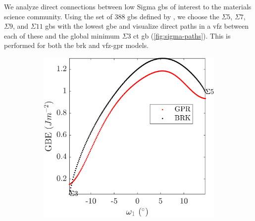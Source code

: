 \documentclass[final,twocolumn,12pt]{elsarticle}
\begin{document}
	We analyze direct connections between low Sigma \glspl{gb} of interest to the materials science community. Using the set of 388 \glspl{gb} defined by \citet{olmstedSurveyComputedGrain2009}, we choose the $\Sigma5$, $\Sigma7$, $\Sigma9$, and $\Sigma11$ \glspl{gb} with the lowest \gls{gbe} and visualize direct paths in a \gls{vfz} between each of these and the global minimum $\Sigma3$ \gls{ct} \gls{gb} (\cref{fig:sigma-paths}). This is performed for both the \gls{brk} and \gls{vfz}-\gls{gpr} models.
	
	\begin{figure}[!htb]
		\centering
		\begin{subfigure}[b]{0.48\textwidth}
			\includegraphics[width=\textwidth]{figures/tunnel-3-5.png}
			\caption{}
			\label{fig:tunnel-3-5}
		\end{subfigure}
		\hfill
		\begin{subfigure}[b]{0.48\textwidth}

\end{subfigure}
\end{figure}
\end{document}
